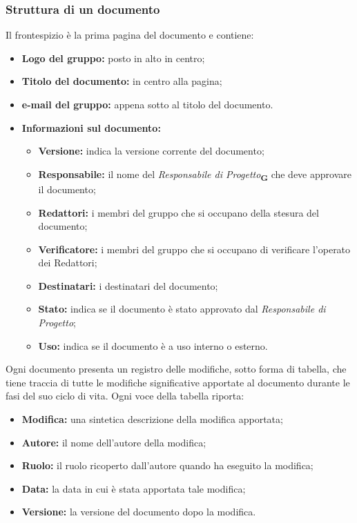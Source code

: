         \subsubsection{Struttura di un documento}
            Il frontespizio è la prima pagina del documento e contiene:
            \begin{itemize}
                \item \textbf{Logo del gruppo:} posto in alto in centro;
                \item \textbf{Titolo del documento:} in centro alla pagina;
                \item \textbf{e-mail del gruppo:} appena sotto al titolo del documento.
                \item \textbf{Informazioni sul documento:}
                    \begin{itemize}
                        \item \textbf{Versione:} indica la versione corrente del documento;
                        \item \textbf{Responsabile:} il nome del \textit{Responsabile di Progetto}\textsubscript{\textbf{G}} che deve approvare il documento;
                        \item \textbf{Redattori:} i membri del gruppo che si occupano della stesura del documento; 
                        \item \textbf{Verificatore:} i membri del gruppo che si occupano di verificare l'operato dei Redattori;
                        \item \textbf{Destinatari:} i destinatari del documento;
                        \item \textbf{Stato:} indica se il documento è stato approvato dal \textit{Responsabile di Progetto};
                        \item \textbf{Uso:} indica se il documento è a uso interno o esterno.
                    \end{itemize} 
            \end{itemize}
            Ogni documento presenta un registro delle modifiche, sotto forma di tabella, che tiene traccia di tutte le modifiche significative apportate al documento durante le fasi del suo ciclo di vita. Ogni voce della tabella riporta:
            \begin{itemize}
                \item \textbf{Modifica:} una sintetica descrizione della modifica apportata;
                \item \textbf{Autore:} il nome dell’autore della modifica;
                \item \textbf{Ruolo:} il ruolo ricoperto dall’autore quando ha eseguito la modifica;
                \item \textbf{Data:} la data in cui è stata apportata tale modifica;
                \item \textbf{Versione:} la versione del documento dopo la modifica.
            \end{itemize}
